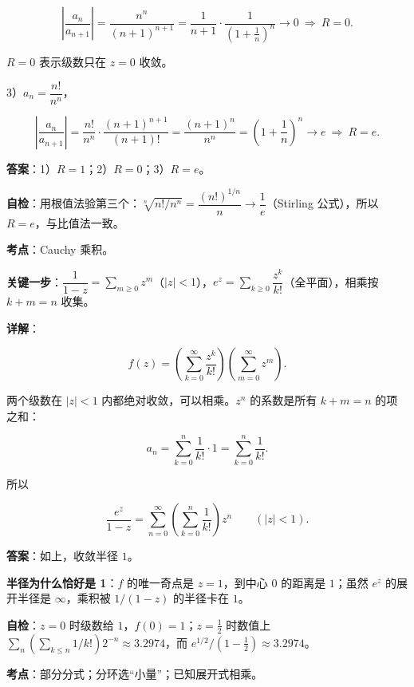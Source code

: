 \documentclass[11pt]{ctexart}
\renewcommand{\qbreak}{\needspace{0.45\textheight}}
\begin{document}
\[ \left|\frac{a_n}{a_{n+1}}\right|=\frac{n^n}{(n+1)^{n+1}}=\frac{1}{n+1}\cdot\frac{1}{\left(1+\frac1n\right)^n}\to0\ \Longrightarrow\ R=0 . \]

$R=0$ 表示级数只在 $z=0$ 收敛。

3）$a_n=\dfrac{n!}{n^n}$，

\[ \left|\frac{a_n}{a_{n+1}}\right|=\frac{n!}{n^n}\cdot\frac{(n+1)^{n+1}}{(n+1)!}=\frac{(n+1)^{n}}{n^{n}}=\left(1+\frac1n\right)^n\to e\ \Longrightarrow\ R=e . \]

\textbf{答案}：1）$R=1$；2）$R=0$；3）$R=e$。

\textbf{自检}：用根值法验第三个：$\sqrt[n]{n!/n^n}=\dfrac{(n!)^{1/n}}{n}\to\dfrac1e$（Stirling 公式），所以 $R=e$，与比值法一致。

\qbreak
{}

\textbf{考点}：Cauchy 乘积。

\textbf{关键一步}：$\dfrac{1}{1-z}=\sum_{m\ge0}z^m$（$|z|<1$），$e^z=\sum_{k\ge0}\dfrac{z^k}{k!}$（全平面），相乘按 $k+m=n$ 收集。

\textbf{详解}：

\[ f(z)=\left(\sum_{k=0}^{\infty}\frac{z^k}{k!}\right)\left(\sum_{m=0}^{\infty}z^m\right) . \]

两个级数在 $|z|<1$ 内都绝对收敛，可以相乘。$z^n$ 的系数是所有 $k+m=n$ 的项之和：

\[ a_n=\sum_{k=0}^{n}\frac{1}{k!}\cdot1=\sum_{k=0}^{n}\frac{1}{k!} . \]

所以

\[ \frac{e^z}{1-z}=\sum_{n=0}^{\infty}\left(\sum_{k=0}^{n}\frac{1}{k!}\right)z^n\qquad(|z|<1) . \]

\textbf{答案}：如上，收敛半径 $1$。

\textbf{半径为什么恰好是 1}：$f$ 的唯一奇点是 $z=1$，到中心 $0$ 的距离是 $1$；虽然 $e^z$ 的展开半径是 $\infty$，乘积被 $1/(1-z)$ 的半径卡在 $1$。

\textbf{自检}：$z=0$ 时级数给 $1$，$f(0)=1$；$z=\tfrac12$ 时数值上 $\sum_{n}\left(\sum_{k\le n}1/k!\right)2^{-n}\approx3.2974$，而 $e^{1/2}/(1-\tfrac12)\approx3.2974$。

\qbreak
{}

\textbf{考点}：部分分式；分环选“小量”；已知展开式相乘。
\end{document}
